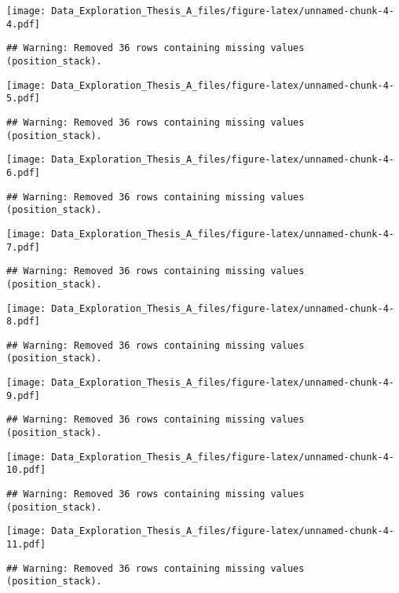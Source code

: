 \documentclass[]{article}
\begin{document}
\texttt{[image: Data\_Exploration\_Thesis\_A\_files/figure-latex/unnamed-chunk-4-4.pdf]}

\begin{verbatim}
## Warning: Removed 36 rows containing missing values (position_stack).
\end{verbatim}

\texttt{[image: Data\_Exploration\_Thesis\_A\_files/figure-latex/unnamed-chunk-4-5.pdf]}

\begin{verbatim}
## Warning: Removed 36 rows containing missing values (position_stack).
\end{verbatim}

\texttt{[image: Data\_Exploration\_Thesis\_A\_files/figure-latex/unnamed-chunk-4-6.pdf]}

\begin{verbatim}
## Warning: Removed 36 rows containing missing values (position_stack).
\end{verbatim}

\texttt{[image: Data\_Exploration\_Thesis\_A\_files/figure-latex/unnamed-chunk-4-7.pdf]}

\begin{verbatim}
## Warning: Removed 36 rows containing missing values (position_stack).
\end{verbatim}

\texttt{[image: Data\_Exploration\_Thesis\_A\_files/figure-latex/unnamed-chunk-4-8.pdf]}

\begin{verbatim}
## Warning: Removed 36 rows containing missing values (position_stack).
\end{verbatim}

\texttt{[image: Data\_Exploration\_Thesis\_A\_files/figure-latex/unnamed-chunk-4-9.pdf]}

\begin{verbatim}
## Warning: Removed 36 rows containing missing values (position_stack).
\end{verbatim}

\texttt{[image: Data\_Exploration\_Thesis\_A\_files/figure-latex/unnamed-chunk-4-10.pdf]}

\begin{verbatim}
## Warning: Removed 36 rows containing missing values (position_stack).
\end{verbatim}

\texttt{[image: Data\_Exploration\_Thesis\_A\_files/figure-latex/unnamed-chunk-4-11.pdf]}

\begin{verbatim}
## Warning: Removed 36 rows containing missing values (position_stack).
\end{verbatim}
\end{document}
